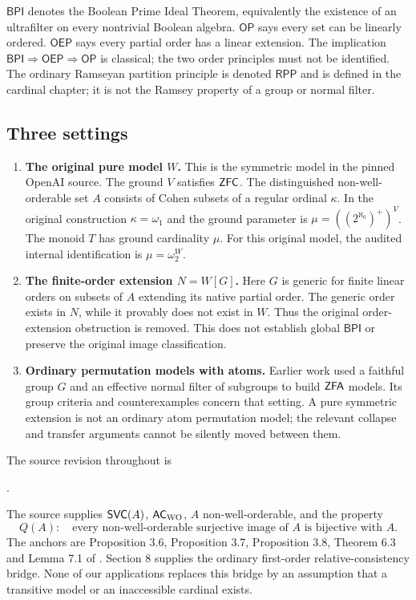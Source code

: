 $\mathsf{BPI}$ denotes the Boolean Prime Ideal Theorem, equivalently the existence of an ultrafilter on every nontrivial Boolean algebra. $\mathsf{OP}$ says every set can be linearly ordered. $\mathsf{OEP}$ says every partial order has a linear extension. The implication $\mathsf{BPI}\Rightarrow\mathsf{OEP}\Rightarrow\mathsf{OP}$ is classical; the two order principles must not be identified. The ordinary Ramseyan partition principle is denoted $\mathsf{RPP}$ and is defined in the cardinal chapter; it is not the Ramsey property of a group or normal filter.

\subsection{Three settings}
\begin{enumerate}
\item \textbf{The original pure model $W$.} This is the symmetric model in the pinned OpenAI source. The ground $V$ satisfies $\mathsf{ZFC}$. The distinguished non-well-orderable set $A$ consists of Cohen subsets of a regular ordinal $\kappa$. In the original construction $\kappa=\omega_1$ and the ground parameter is $\mu=((2^{\aleph_0})^+)^V$. The monoid $T$ has ground cardinality $\mu$. For this original model, the audited internal identification is $\mu=\omega_2^W$.
\item \textbf{The finite-order extension $N=W[G]$.} Here $G$ is generic for finite linear orders on subsets of $A$ extending its native partial order. The generic order exists in $N$, while it provably does not exist in $W$. Thus the original order-extension obstruction is removed. This does not establish global $\mathsf{BPI}$ or preserve the original image classification.
\item \textbf{Ordinary permutation models with atoms.} Earlier work used a faithful group $G$ and an effective normal filter of subgroups to build $\mathsf{ZFA}$ models. Its group criteria and counterexamples concern that setting. A pure symmetric extension is not an ordinary atom permutation model; the relevant collapse and transfer arguments cannot be silently moved between them.
\end{enumerate}

The source revision throughout is
\begin{center}\small{}.\end{center}
The source supplies $\mathsf{SVC}(A)$, $\mathsf{AC}_{\mathrm{WO}}$, $A$ non-well-orderable, and the property
\[
Q(A):\quad\text{every non-well-orderable surjective image of $A$ is bijective with $A$.}
\]
The anchors are Proposition 3.6, Proposition 3.7, Proposition 3.8, Theorem 6.3 and Lemma 7.1 of \cite{OpenAI}. Section 8 supplies the ordinary first-order relative-consistency bridge. None of our applications replaces this bridge by an assumption that a transitive model or an inaccessible cardinal exists.

